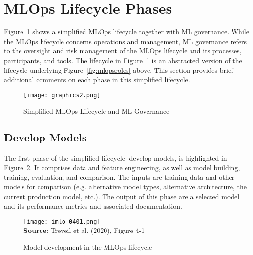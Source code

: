 \FloatBarrier
\section{MLOps Lifecycle Phases}
\label{sec:mlopslifecycle}

Figure~\ref{fig:mlopssimplifiedcycle} shows a simplified MLOps lifecycle together with ML governance. While the MLOps lifecycle concerns operations and management, ML governance refers to the oversight and risk management of the MLOps lifecycle and its processes, participants, and tools. The lifecycle in Figure~\ref{fig:mlopssimplifiedcycle} is an abstracted version of the lifecycle underlying Figure~\ref{fig:mlopsroles} above. This section provides brief additional comments on each phase in this simplified lifecycle. 

\begin{figure}
\centering
\texttt{[image: graphics2.png]} \\
\caption{Simplified MLOps Lifecycle and ML Governance}
\label{fig:mlopssimplifiedcycle}
\end{figure}

\FloatBarrier
\subsection{Develop Models}

The first phase of the simplified lifecycle, develop models, is highlighted in Figure~\ref{fig:developmodels}. It comprises data and feature engineering, as well as model building, training, evaluation, and comparison. The inputs are training data and other models for comparison (e.g. alternative model types, alternative architecture, the current production model, etc.). The output of this phase are a selected model and its performance metrics and associated documentation. 

\begin{figure}
\centering
\texttt{[image: imlo\_0401.png]} \\

\vspace{\baselineskip}
\scriptsize \textbf{Source}: Treveil et al. (2020), Figure 4-1
\caption{Model development in the MLOps lifecycle}
\label{fig:developmodels}
\end{figure}

